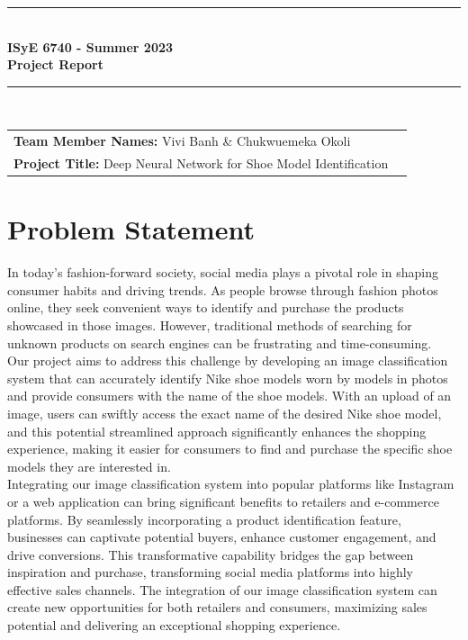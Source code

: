 \documentclass[11pt,a4paper]{article}
\begin{document}

\begin{titlepage}
	\clearpage\thispagestyle{empty}
	\centering
	\vspace{1cm}
		
	\rule{\linewidth}{1mm} \\[0.5cm]
	{ \Large \bfseries ISyE 6740 - Summer 2023\\[0.2cm]
		Project Report}\\[0.5cm]
	\rule{\linewidth}{1mm} \\[1cm]

		\begin{tabular}{l p{5cm}}
		\textbf{Team Member Names:} Vivi Banh \& Chukwuemeka Okoli \\[10pt]
		\textbf{Project Title:} Deep Neural Network for Shoe Model Identification  \\[10pt]
		\end{tabular} 

\end{titlepage}	
	

\section{Problem Statement}\label{sec1}
In today's fashion-forward society, social media plays a pivotal role in shaping consumer habits and driving trends. As people browse through fashion photos online, they seek convenient ways to identify and purchase the products showcased in those images. However, traditional methods of searching for unknown products on search engines can be frustrating and time-consuming.  \\

\noindent
Our project aims to address this challenge by developing an image classification system that can accurately identify Nike shoe models worn by models in photos and provide consumers with the name of the shoe models. With an upload of an image, users can swiftly access the exact name of the desired Nike shoe model, and this potential streamlined approach significantly enhances the shopping experience, making it easier for consumers to find and purchase the specific shoe models they are interested in. \\

\noindent
Integrating our image classification system into popular platforms like Instagram or a web application can bring significant benefits to retailers and e-commerce platforms. By seamlessly incorporating a product identification feature, businesses can captivate potential buyers, enhance customer engagement, and drive conversions. This transformative capability bridges the gap between inspiration and purchase, transforming social media platforms into highly effective sales channels. The integration of our image classification system can create new opportunities for both retailers and consumers, maximizing sales potential and delivering an exceptional shopping experience. 
\end{document}
